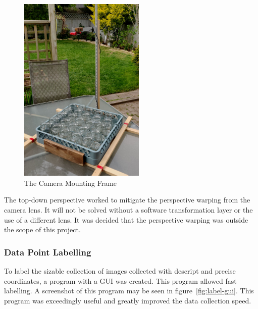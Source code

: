 \documentclass[11pt]{article}
\begin{document}
                \begin{figure}[ht]
                    \centering
                    \includegraphics[height=9cm]{images/frame.jpg}      %
                    \caption{The Camera Mounting Frame}\label{fig:frame}
                \end{figure}

                The top-down perspective worked to mitigate the perspective warping from the camera lens. It will not be solved without a software transformation layer or the use of a different lens. It was decided that the perspective warping was outside the scope of this project.

            \subsubsection{Data Point Labelling}
                To label the sizable collection of images collected with descript and precise coordinates, a program with a GUI was created. This program allowed fast labelling. A screenshot of this program may be seen in figure~\ref{fig:label-gui}. This program was exceedingly useful and greatly improved the data collection speed.
\end{document}
